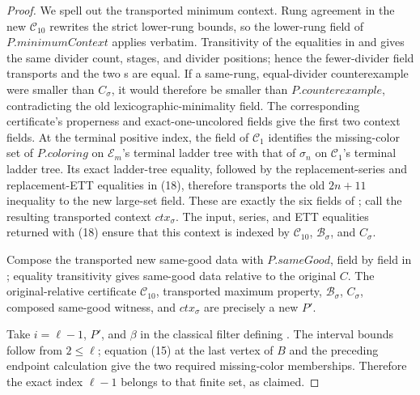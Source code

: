 \begin{proof}
We spell out the transported minimum context.  Rung agreement in the new
 \(\mathcal C_{10}\) rewrites
the strict
lower-rung bounds, so the lower-rung field of
\(P.\mathit{minimumContext}\) applies verbatim.  Transitivity of the
equalities in  and
 gives the same divider count, stages, and
divider positions; hence the fewer-divider field transports and the two
s are equal.  If a same-rung,
equal-divider counterexample were smaller than \(C_\sigma\), it would
therefore be smaller than \(P.\mathit{counterexample}\), contradicting
the old lexicographic-minimality field.  The corresponding certificate's
properness and exact-one-uncolored fields give the first two context
fields.
At the terminal positive index, the
 field of \(\mathcal C_1\) identifies the
missing-color set of \(P.\mathit{coloring}\) on
\(\mathcal E_m\)'s terminal ladder tree with that of \(\sigma_n\) on
\(\mathcal C_1\)'s terminal ladder tree.  Its exact ladder-tree equality,
followed by the replacement-series and replacement-ETT equalities in
(18), therefore transports the old \(2n+11\) inequality to the new
large-set field.  These are exactly the six fields of
; call the resulting
transported context \(\mathit{ctx}_\sigma\).  The input, series, and ETT
equalities returned with (18) ensure that this context is indexed by
\(\mathcal C_{10}\), \(\mathcal B_\sigma\), and \(C_\sigma\).

Compose the transported new same-good data with
\(P.\mathit{sameGood}\), field by
field in ; equality transitivity gives
same-good data relative to the original \(C\).  The original-relative
certificate \(\mathcal C_{10}\), transported maximum property,
\(\mathcal B_\sigma\), \(C_\sigma\), composed same-good witness, and
\(\mathit{ctx}_\sigma\) are precisely a new
 \(P'\).

Take \(i=\ell-1\), \(P'\), and \(\beta\) in the classical filter defining
.  The interval bounds
follow from \(2\leq\ell\); equation (15) at the last vertex of \(B\) and
the preceding endpoint calculation give the two required missing-color
memberships.  Therefore the exact index \(\ell-1\) belongs to that finite
set, as claimed.
\end{proof}
